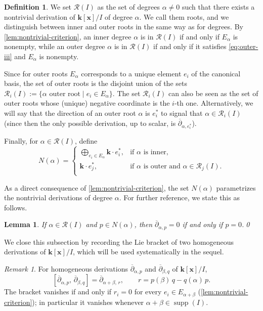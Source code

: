 \documentclass[11pt,letterpaper,reqno]{amsart}
\newtheorem{lemma}[lemma]{Lemma}
\theoremstyle{remark}
\newtheorem{remark}[remark]{Remark}
\theoremstyle{definition}
\newtheorem{definition}[definition]{Definition}
\def\XX{\mathbf{x}}
\newcommand{\KK}[0]{\ensuremath{\mathbf{k}}}
\newcommand{\supp}[0]{\ensuremath{\operatorname{supp}}}
\begin{document}
\begin{definition}\label{def:roots}
We set $\mathcal R(I)$ as the set of degrees $\alpha\neq0$ such that there exists a nontrivial derivation of $\KK[\XX]/I$ of degree $\alpha$. We call them roots, and we distinguish between inner and outer roots in the same way as for degrees. By \cref{lem:nontrivial-criterion}, an inner degree $\alpha$ is in $\mathcal R(I)$ if and only if $E_\alpha$ is nonempty, while an outer degree $\alpha$ is in $\mathcal R(I)$ if and only if it satisfies \eqref{eq:outer-iii} and $E_\alpha$ is nonempty.

Since for outer roots $E_\alpha$ corresponds to a unique element $e_i$ of the canonical basis, the set of outer roots is the disjoint union of the sets $\mathcal{R}_{i}(I):=\{\alpha\text{ outer root}\mid e_i\in E_\alpha\}$. The set $\mathcal R_i(I)$ can also be seen as the set of outer roots whose (unique) negative coordinate is the $i$-th one. Alternatively, we will say that the direction of an outer root $\alpha$ is $e_i^*$ to signal that $\alpha\in\mathcal{R}_{i}(I)$ (since then the only possible derivation, up to scalar, is $\overline\partial_{\alpha,e_i^*}$).

Finally, for $\alpha\in \mathcal{R}(I)$, define
$$
N(\alpha) =
\begin{cases}
  \displaystyle{\bigoplus_{{e_i}\in E_\alpha}} \KK\cdot {e_i^*}  , & \text{if } \alpha \text{ is inner}, \\[0.8em]
 \KK\cdot e_j^* , & \text{if } \alpha \text{ is outer and } \alpha\in\mathcal{R}_{j}(I). \\[0.8em]
\end{cases}
$$
\end{definition}

As a direct consequence of \cref{lem:nontrivial-criterion}, the set $N(\alpha)$ parametrizes the nontrivial derivations of degree $\alpha$. For further reference, we state this as follows.

\begin{lemma}\label{lem:nonzero-deriv}
If $\alpha \in \mathcal{R}(I)$ and $p \in N(\alpha)$, then
$\overline{\partial}_{\alpha,p}=0$ if and only if $p=0$.\qed
\end{lemma}

We close this subsection by recording the Lie bracket of two homogeneous
derivations of $\KK[\XX]/I$, which will be used systematically in the sequel.

\begin{remark}\label{rmk:lie-bracket}
For homogeneous derivations $\overline\partial_{\alpha,p}$ and
$\overline\partial_{\beta,q}$ of $\KK[\XX]/I$,
$$
[\overline\partial_{\alpha,p},\,\overline\partial_{\beta,q}]
= \overline\partial_{\alpha+\beta,\,r},
\qquad r = p(\beta)\,q - q(\alpha)\,p.
$$
The bracket vanishes if and only if $r_i = 0$ for every
$e_i\in E_{\alpha+\beta}$ (\cref{lem:nontrivial-criterion}); in particular it vanishes
whenever $\alpha + \beta \in \supp(I)$.
\end{remark}
\end{document}
